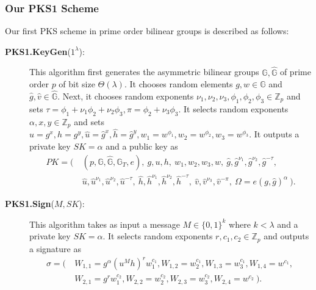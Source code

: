 \documentclass[11pt,letterpaper]{article}
\newcommand{\G}{\mathbb{G}}
\newcommand{\Z}{\mathbb{Z}}
\newcommand{\bits}{\{0,1\}}
\begin{document}
\subsubsection{Our PKS1 Scheme}

Our first PKS scheme in prime order bilinear groups is described as follows:

\begin{description}
\item [\textbf{PKS1.KeyGen}($1^\lambda$):] This algorithm first generates
    the asymmetric bilinear groups $\G, \hat{\G}$ of prime order $p$ of bit
    size $\Theta(\lambda)$. It chooses random elements $g, w \in \G$ and
    $\hat{g}, \hat{v} \in \hat{\G}$. Next, it chooses random exponents
    $\nu_1, \nu_2, \nu_3, \phi_1, \phi_2, \phi_3 \in \Z_p$ and sets $\tau =
    \phi_1 + \nu_1 \phi_2 + \nu_2 \phi_3, \pi = \phi_2 + \nu_3 \phi_3$. It
    selects random exponents $\alpha, x, y \in \Z_p$ and sets $u = g^x, h =
    g^y, \hat{u} = \hat{g}^x, \hat{h} = \hat{g}^y, w_1 = w^{\phi_1}, w_2 =
    w^{\phi_2}, w_3 = w^{\phi_3}$. It outputs a private key $SK = \alpha$
    and a public key as
    \begin{align*}
    PK = \Big(~
    &   (p, \G, \hat{\G}, \G_T, e),~
        g, u, h,~ w_1, w_2, w_3, w,~
        \hat{g}, \hat{g}^{\nu_1}, \hat{g}^{\nu_2}, \hat{g}^{-\tau},~ \\
    &   \hat{u}, \hat{u}^{\nu_1}, \hat{u}^{\nu_2}, \hat{u}^{-\tau},~
        \hat{h}, \hat{h}^{\nu_1}, \hat{h}^{\nu_2}, \hat{h}^{-\tau},~
        \hat{v}, \hat{v}^{\nu_3}, \hat{v}^{-\pi},~
        \Omega = e(g,\hat{g})^{\alpha}
    ~\Big).
    \end{align*}

\item [\textbf{PKS1.Sign}($M, SK$):] This algorithm takes as input a
    message $M \in \bits^k$ where $k < \lambda$ and a private key $SK =
    \alpha$. It selects random exponents $r, c_1, c_2 \in \Z_p$ and outputs
    a signature as
    \begin{align*}
    \sigma = \Big(~
    &   W_{1,1} = g^{\alpha} (u^M h)^r w_1^{c_1},
        W_{1,2} = w_2^{c_1},
        W_{1,3} = w_3^{c_1},
        W_{1,4} = w^{c_1},~ \\
    &   W_{2,1} = g^r w_1^{c_2},
        W_{2,2} = w_2^{c_2},
        W_{2,3} = w_3^{c_2},
        W_{2,4} = w^{c_2}
    ~\Big).
    \end{align*}


\end{description}
\end{document}
